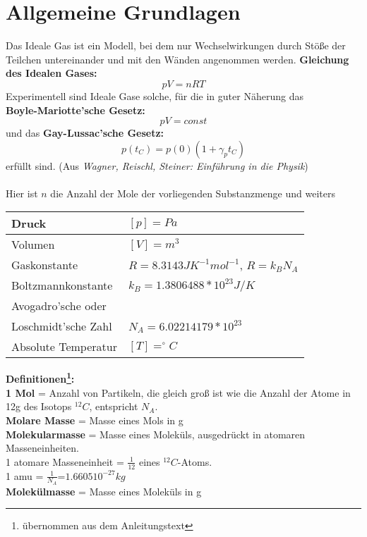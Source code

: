\documentclass{article}
\begin{document}
\section{Allgemeine Grundlagen}
Das Ideale Gas ist ein Modell, bei dem nur Wechselwirkungen durch Stöße der Teilchen untereinander und mit den Wänden angenommen werden.
\textbf{Gleichung des Idealen Gases:}
\begin{equation}
\label{gasgleichung}
pV=nRT
\end{equation}
Experimentell sind Ideale Gase solche, für die in guter Näherung das\\ \textbf{Boyle-Mariotte'sche Gesetz:}
\begin{equation}
\label{boyle-mariotte}
pV=const
\end{equation}
und das \textbf{Gay-Lussac'sche Gesetz:}
\begin{equation}
\label{gay-lussac}
p(t_C)=p(0)(1+\gamma_p t_C)
\end{equation}
erfüllt sind. (Aus \textit{Wagner, Reischl, Steiner: Einführung in die Physik})\\
\\
Hier ist $n$ die Anzahl der Mole der vorliegenden Substanzmenge und weiters
\begin{flushleft}
\begin{tabular}{|l|l|}
\hline Druck & $[p]=Pa$\\
\hline Volumen & $[V]=m^3$\\
\hline Gaskonstante & $R=8.3143 J K^{-1} mol^{-1}$, $R=k_B N_A$\\
\hline Boltzmannkonstante & $k_B=1.3806488*10^{23}J/K$\\
\hline Avogadro'sche oder &\\
Loschmidt'sche Zahl & $N_A=6.02214179*10^{23}$\\
\hline Absolute Temperatur & $[T]=^\circ C$\\
\hline
\end{tabular}
\end{flushleft}
\textbf{Definitionen\footnote{übernommen aus dem Anleitungstext}:}\\
\textbf{1 Mol} = Anzahl von Partikeln, die gleich groß ist wie die Anzahl der Atome in 12g des Isotops $^{12}C$, entspricht $N_A$. \\
\textbf{Molare Masse} = Masse eines Mols in g\\
\textbf{Molekularmasse} = Masse eines Moleküls, ausgedrückt in atomaren Masseneinheiten. \\
1 atomare Masseneinheit = $\frac{1}{12}$ eines $^{12}C$-Atoms.\\
1 amu = $\frac{1}{N_A}$=$1.6605 10^{-27}kg$\\
\textbf{Molekülmasse} = Masse eines Moleküls in g\\
\newpage
\end{document}
